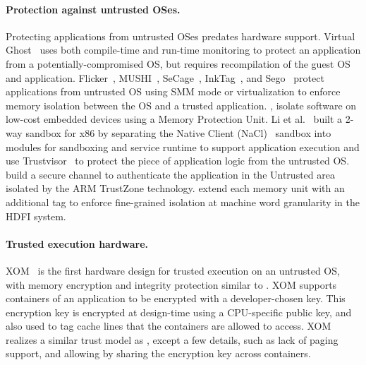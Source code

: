 \label{sec:related:sgx}

%
%
%


\paragraph{Protection against untrusted OSes.}

Protecting applications from untrusted OSes predates hardware support. 
Virtual Ghost~\cite{criswell2014virtualghost} uses both compile-time and run-time monitoring to protect an application
from a potentially-compromised OS, but requires recompilation of the guest OS and application.
Flicker~\cite{flicker}, MUSHI~\cite{zhang2012mushi}, SeCage~\cite{liu15secage}, InkTag~\cite{inktag}, and Sego~\cite{kwon16sego-sigops} protect applications from untrusted OS using SMM mode or virtualization
to enforce memory isolation between the OS and a trusted application.
\citet{koeberl2014trustlite}, isolate software on low-cost embedded devices using a Memory Protection Unit.
Li et al.~\cite{li2014minibox} built a 2-way sandbox for x86 by separating the Native Client (NaCl)~\cite{yee2009native} sandbox into modules for sandboxing and service runtime to support application execution and use Trustvisor~\cite{trustvisor} to protect the piece of application logic from the untrusted OS.
\citet{jang2015secret} build a secure channel to authenticate the application in the Untrusted area isolated by the ARM TrustZone technology.
\citet{songhdfi} extend each memory unit with an additional tag
to enforce fine-grained isolation at machine word granularity in the HDFI system.

\paragraph{Trusted execution hardware.}
XOM~\cite{lie2003implementing} is the first hardware design for trusted execution on an untrusted OS,
with memory encryption and integrity protection similar to \sgx{}. XOM supports containers of an application to be encrypted with a developer-chosen key. This encryption key is encrypted at design-time using a CPU-specific public key, and also used to tag cache lines that the containers are allowed to access.
XOM realizes a similar trust model as \sgx{}, except a few details, such as lack of paging support, and allowing  by sharing the encryption key across containers.


